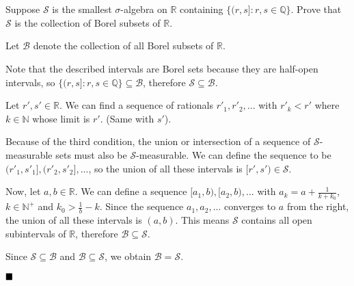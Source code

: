 \documentclass[11pt, a4paper, tikz]{article}
\newcommand{\centsection}[1]{
	\section*{\centering{#1}}
}
\renewcommand{\qed}{\hfill\blacksquare}
\newcommand{\naturals}{
	\ensuremath{\mathbb{N}}
}
\newcommand{\rationals}{
	\ensuremath{\mathbb{Q}}
}
\newcommand{\reals}{
	\ensuremath{\mathbb{R}}
}
\newcommand{\sigmaAlgebra}[1]{
	\ensuremath{\mathcal{#1}}
}
\begin{document}
	\centsection{Exercise 3}
	
	\begin{formulationBox}
		Suppose $\sigmaAlgebra{S}$ is the smallest $\sigma$-algebra on $\reals$ containing $\{(r,s]:r,s\in\rationals\}$. Prove that $\sigmaAlgebra{S}$ is the collection of Borel subsets of $\reals$.
	\end{formulationBox}

	Let $\sigmaAlgebra{B}$ denote the collection of all Borel subsets of $\reals$.

	Note that the described intervals are Borel sets because they are half-open intervals, so $\{(r,s]:r,s\in\rationals\}\subseteq\sigmaAlgebra{B}$, therefore $\sigmaAlgebra{S}\subseteq\sigmaAlgebra{B}$.
	
	Let $r',s'\in\reals$. We can find a sequence of rationals $r'_1, r'_2, ...$ with $r'_k < r'$ where $k\in\naturals$ whose limit is $r'$. (Same with $s'$).
	
	Because of the third condition, the union or intersection of a sequence of $\sigmaAlgebra{S}$-measurable sets must also be $\sigmaAlgebra{S}$-measurable. We can define the sequence to be $(r'_1, s'_1], (r'_2,s'_2], ...$, so the union of all these intervals is $[r', s')\in\sigmaAlgebra{S}$.
	
	Now, let $a,b\in\reals$. We can define a sequence $[a_1, b), [a_2, b), ...$ with $a_k = a+\frac{1}{k+k_0}$, $k\in\naturals^+$ and $k_0>\frac{1}{b}-k$. Since the sequence $a_1, a_2, ...$ converges to $a$ from the right, the union of all these intervals is $(a, b)$. This means $\sigmaAlgebra{S}$ contains all open subintervals of $\reals$, therefore $\sigmaAlgebra{B} \subseteq \sigmaAlgebra{S}$.
	
	Since $\sigmaAlgebra{S}\subseteq\sigmaAlgebra{B}$ and $\sigmaAlgebra{B} \subseteq \sigmaAlgebra{S}$, we obtain $\sigmaAlgebra{B} = \sigmaAlgebra{S}$.
	
	$\qed$
\end{document}
